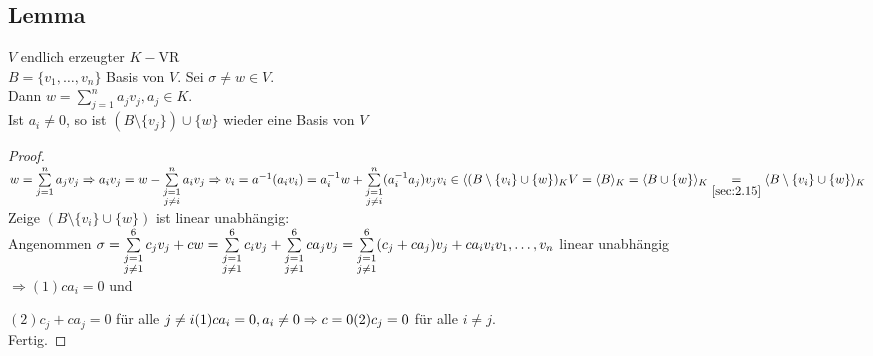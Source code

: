 \subsection{Lemma}\label{sec:2.19}
$V$ endlich erzeugter $K-$VR\\
$B = \{v_1,\ldots,v_n\}$ Basis von $V$. Sei $\sigma \ne w \in V.$\\
Dann $w = \sum\limits^n_{j=1}a_jv_j, a_j \in K$.\\
Ist $a_i \ne 0$, so ist $(B \setminus \{v_j \}) \cup \{w\}$ wieder eine Basis von $V$
\begin{proof}
$w = \sum\limits_{j=1}^{n}a_jv_j \Rightarrow a_iv_j = w - \sum\limits_{\substack{j=1\\j\ne i}}^{n}a_iv_j\\
\Rightarrow v_i = a^{-1}(a_iv_i)= a_i^{-1}w + \sum\limits_{\substack{j=1\\j\ne i}}^{n}(a_i^{-1}a_j)v_j \\
v_i \in \langle(B\setminus \{v_i \} \cup \{w\} )_K\\
V = \langle B \rangle_K = \langle B \cup \{w\}\rangle_K \underset{\ref{sec:2.15}}{=} \langle B \setminus \{v_i\} \cup \{w\}\rangle_K$\\
Zeige $(B \setminus \{v_i\} \cup \{w\})$ ist linear unabhängig:\\
Angenommen $\sigma = \sum\limits^6_{\substack{j=1\\j\ne1}} c_jv_j + cw = \sum\limits^6_{\substack{j=1\\j\ne1}} c_iv_j + \sum\limits^6_{\substack{j=1\\j\ne1}}ca_j v_j = \sum\limits^6_{\substack{j=1\\j\ne1}} (c_j + ca_j)v_j + ca_iv_i\\
v_1,\ldots,v_n$ linear unabhängig\\ $\Rightarrow (1)ca_i = 0$ und \par
$(2)c_j + ca_j = 0$ für alle $j \ne i\\
(1) c a_i = 0,a_i \ne 0 \Rightarrow c = 0\\
(2) c_j = 0$ für alle $i \ne j$.\\
Fertig.
\end{proof}
